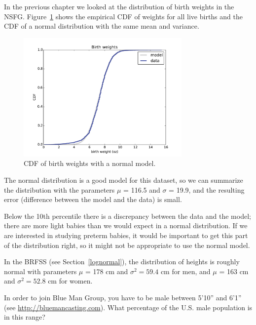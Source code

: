 \documentclass[12pt]{book}
\begin{document}
In the previous chapter we looked at the distribution of birth
weights in the NSFG.  Figure~\ref{nsfg_birthwgt_model} shows the
empirical CDF of weights for all live births and the CDF of
a normal distribution with the same mean and variance.

\begin{figure}
\centerline{\includegraphics[height=2.5in]{figs/nsfg_birthwgt_model.pdf}}
\caption{CDF of birth weights with a normal model.}
\label{nsfg_birthwgt_model}
\end{figure}

The normal distribution is a good model for this dataset, so
we can summarize the distribution with the parameters
$\mu$ = 116.5 and $\sigma$ = 19.9, and the resulting error
(difference between the model and the data) is small.

Below the 10th percentile there is a discrepancy between the data
and the model; there are more light babies than we would expect in
a normal distribution.  If we are interested in studying preterm
babies, it would be important to get this part of the distribution
right, so it might not be appropriate to use the normal
model.

\begin{exercise}
In the BRFSS (see Section~\ref{lognormal}), the distribution of
heights is roughly normal with parameters $\mu$ = 178 cm and
$\sigma^2 = 59.4$ cm for men, and $\mu$ = 163 cm and $\sigma^2 = 52.8$ cm for
women.

In order to join Blue Man Group, you have to be male between 5'10''
and 6'1'' (see \url{http://bluemancasting.com}).  What percentage of the
U.S. male population is in this range?
\end{exercise}
\end{document}
